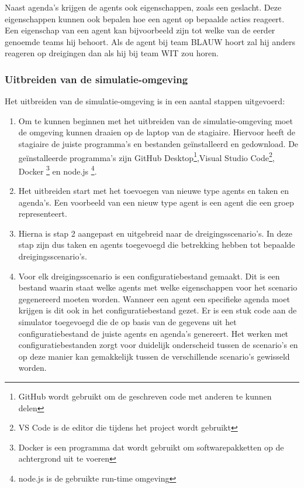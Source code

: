 \documentclass[12pt, letterpaper]{article}
\begin{document}
Naast agenda's krijgen de agents ook eigenschappen, zoals een geslacht. Deze eigenschappen kunnen ook bepalen hoe een agent op bepaalde acties reageert. Een eigenschap van een agent kan bijvoorbeeld zijn tot welke van de eerder genoemde teams hij behoort. Als de agent bij team BLAUW hoort zal hij anders reageren op dreigingen dan als hij bij team WIT zou horen. 

\subsubsection{Uitbreiden van de simulatie-omgeving}
Het uitbreiden van de simulatie-omgeving is in een aantal stappen uitgevoerd:
\begin{enumerate}
    \item Om te kunnen beginnen met het uitbreiden van de simulatie-omgeving moet de omgeving kunnen draaien op de laptop van de stagiaire. Hiervoor heeft de stagiaire de juiste programma's en bestanden geïnstalleerd en gedownload. De geïnstalleerde programma's zijn GitHub Desktop\footnote{GitHub wordt gebruikt om de geschreven code met anderen te kunnen delen},Visual Studio Code\footnote{VS Code is de editor die tijdens het project wordt gebruikt}, Docker \footnote{Docker is een programma dat wordt gebruikt om softwarepakketten op de achtergrond uit te voeren} en node.js \footnote{node.js is de gebruikte run-time omgeving}.
    \item Het uitbreiden start met het toevoegen van nieuwe type agents en taken en agenda's. Een voorbeeld van een nieuw type agent is een agent die een groep representeert.
    \item Hierna is stap 2 aangepast en uitgebreid naar de dreigingsscenario's. In deze stap zijn dus taken en agents toegevoegd die betrekking hebben tot bepaalde dreigingsscenario's.
    \item Voor elk dreigingsscenario is een configuratiebestand gemaakt. Dit is een bestand waarin staat welke agents met welke eigenschappen voor het scenario gegenereerd moeten worden. Wanneer een agent een specifieke agenda moet krijgen is dit ook in het configuratiebestand gezet. Er is een stuk code aan de simulator toegevoegd die de op basis van de gegevens uit het configuratiebestand de juiste agents en agenda's genereert. Het werken met configuratiebestanden zorgt voor duidelijk onderscheid tussen de scenario's en op deze manier kan gemakkelijk tussen de verschillende scenario's gewisseld worden.
\end{enumerate}
\end{document}
